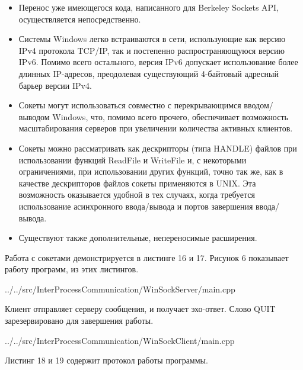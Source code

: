 \documentclass[a4paper, 12pt]{report}		%
\begin{document}
\begin{itemize}
\item Перенос уже имеющегося кода, написанного для Berkeley Sockets API, осуществляется непосредственно.

\item Системы Windows легко встраиваются в сети, использующие как версию IPv4 протокола TCP/IP, так и постепенно распространяющуюся версию IPv6. Помимо всего остального, версия IPv6 допускает использование более длинных IP-адресов, преодолевая существующий 4-байтовый адресный барьер версии IPv4.

\item Сокеты могут использоваться совместно с перекрывающимся вводом/выводом Windows, что, помимо всего прочего, обеспечивает возможность масштабирования серверов при увеличении количества активных клиентов.

\item Сокеты можно рассматривать как дескрипторы (типа HANDLE) файлов при использовании функций ReadFile и WriteFile и, с некоторыми ограничениями, при использовании других функций, точно так же, как в качестве дескрипторов файлов сокеты применяются в UNIX. Эта возможность оказывается удобной в тех случаях, когда требуется использование асинхронного ввода/вывода и портов завершения ввода/вывода.

\item Существуют также дополнительные, непереносимые расширения.
\end{itemize}

Работа с сокетами демонстрируется в листинге 16 и 17. Рисунок 6 показывает работу программ, из этих листингов.
\newpage


{../../src/InterProcessCommunication/WinSockServer/main.cpp}

Клиент отправляет серверу сообщения, и получает эхо-ответ. Слово QUIT зарезервировано для завершения работы.


{../../src/InterProcessCommunication/WinSockClient/main.cpp}

Листинг 18 и 19 содержит протокол работы программы.


\end{document}
